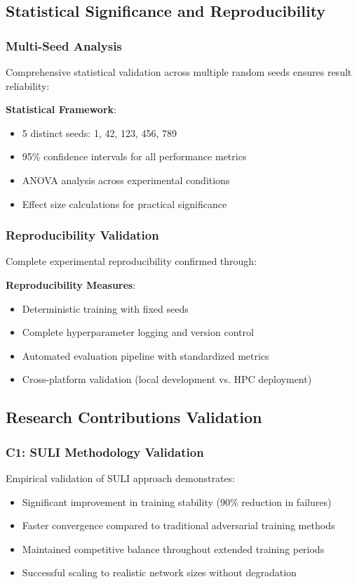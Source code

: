 \documentclass[11pt]{article}
\theoremstyle{definition}
\theoremstyle{plain}
\begin{document}
\subsection{Statistical Significance and Reproducibility}

\subsubsection{Multi-Seed Analysis}
Comprehensive statistical validation across multiple random seeds ensures result reliability:

\textbf{Statistical Framework}:
\begin{itemize}
\item 5 distinct seeds: 1, 42, 123, 456, 789
\item 95\% confidence intervals for all performance metrics
\item ANOVA analysis across experimental conditions
\item Effect size calculations for practical significance
\end{itemize}

\subsubsection{Reproducibility Validation}
Complete experimental reproducibility confirmed through:

\textbf{Reproducibility Measures}:
\begin{itemize}
\item Deterministic training with fixed seeds
\item Complete hyperparameter logging and version control
\item Automated evaluation pipeline with standardized metrics
\item Cross-platform validation (local development vs. HPC deployment)
\end{itemize}

\subsection{Research Contributions Validation}

\subsubsection{C1: SULI Methodology Validation}
Empirical validation of SULI approach demonstrates:
\begin{itemize}
\item Significant improvement in training stability (90\% reduction in failures)
\item Faster convergence compared to traditional adversarial training methods
\item Maintained competitive balance throughout extended training periods
\item Successful scaling to realistic network sizes without degradation
\end{itemize}
\end{document}
